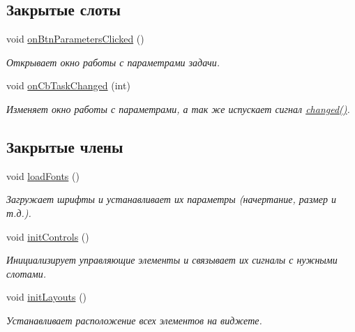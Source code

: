 \subsection*{Закрытые слоты}
\begin{DoxyCompactItemize}
\item 
void \hyperlink{class_task_widget_a72a39f8729f530685d0cb2042e1dc142}{on\+Btn\+Parameters\+Clicked} ()\hypertarget{class_task_widget_a72a39f8729f530685d0cb2042e1dc142}{}\label{class_task_widget_a72a39f8729f530685d0cb2042e1dc142}

\begin{DoxyCompactList}\small\item\em Открывает окно работы с параметрами задачи. \end{DoxyCompactList}\item 
void \hyperlink{class_task_widget_afb4933c6c55916e161ab614c26c88975}{on\+Cb\+Task\+Changed} (int)\hypertarget{class_task_widget_afb4933c6c55916e161ab614c26c88975}{}\label{class_task_widget_afb4933c6c55916e161ab614c26c88975}

\begin{DoxyCompactList}\small\item\em Изменяет окно работы с параметрами, а так же испускает сигнал \hyperlink{class_task_widget_a881ad67de3b3b2171820b7068fc97714}{changed()}. \end{DoxyCompactList}\end{DoxyCompactItemize}
\subsection*{Закрытые члены}
\begin{DoxyCompactItemize}
\item 
void \hyperlink{class_task_widget_a941ea41fcf94ff21f2b28e1ad61c8f02}{load\+Fonts} ()
\begin{DoxyCompactList}\small\item\em Загружает шрифты и устанавливает их параметры (начертание, размер и т.\+д.). \end{DoxyCompactList}\item 
void \hyperlink{class_task_widget_a4611aec0bce1869e7920f5cf7d1f7ac5}{init\+Controls} ()\hypertarget{class_task_widget_a4611aec0bce1869e7920f5cf7d1f7ac5}{}\label{class_task_widget_a4611aec0bce1869e7920f5cf7d1f7ac5}

\begin{DoxyCompactList}\small\item\em Инициализирует управляющие элементы и связывает их сигналы с нужными слотами. \end{DoxyCompactList}\item 
void \hyperlink{class_task_widget_a99a9b36d3fc9e0d43507242f79bcccb5}{init\+Layouts} ()\hypertarget{class_task_widget_a99a9b36d3fc9e0d43507242f79bcccb5}{}\label{class_task_widget_a99a9b36d3fc9e0d43507242f79bcccb5}

\begin{DoxyCompactList}\small\item\em Устанавливает расположение всех элементов на виджете. \end{DoxyCompactList}\end{DoxyCompactItemize}
